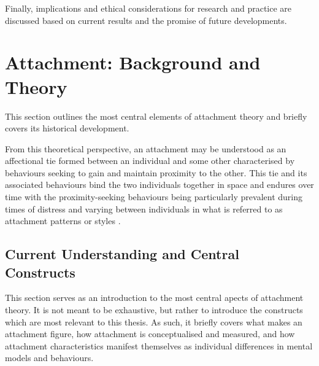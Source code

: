 \documentclass[12pt]{report}
\begin{document}
Finally, implications and ethical considerations for research and practice are discussed based on current results and the promise of future developments.

\chapter{Attachment: Background and Theory}
This section outlines the most central elements of attachment theory and briefly covers its historical development.

From this theoretical perspective, an attachment may be understood as an affectional tie formed between an individual and some other characterised by behaviours seeking to gain and maintain proximity to the other.
This tie and its associated behaviours bind the two individuals together in space and endures over time with the proximity-seeking behaviours being particularly prevalent during times of distress and varying between individuals in what is referred to as attachment patterns or styles \cite{Ainsworth1970,Bowlby1988}.

\section{Current Understanding and Central Constructs}
\label{sec: Current understanding}
This section serves as an introduction to the most central apects of attachment theory.
It is not meant to be exhaustive, but rather to introduce the constructs which are most relevant to this thesis.
As such, it briefly covers what makes an attachment figure, how attachment is conceptualised and measured, and how attachment characteristics manifest themselves as individual differences in mental models and behaviours.
\end{document}
